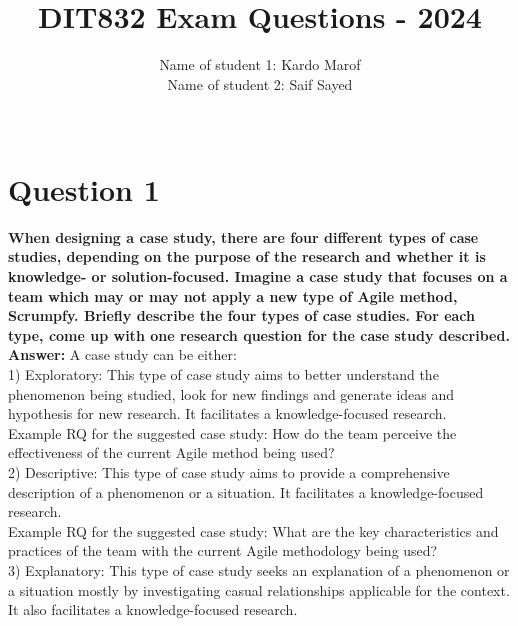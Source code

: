 \documentclass[conference]{IEEEtran}
\begin{document}
\title{DIT832 Exam Questions - 2024}

\author{Name of student 1: Kardo Marof\\
Name of student 2: Saif Sayed\\ \\
}

\maketitle


\section{Question 1}

\textbf{When designing a case study, there are four different types of case studies, depending on the purpose of the research and whether it is knowledge- or solution-focused. Imagine a case study that focuses on a team which may or may not apply a new type of Agile method, Scrumpfy. Briefly describe the four types of case studies. For each type, come up with one research question for the case study described.} \\

\textbf{Answer:} A case study can be either: \\

1) Exploratory: This type of case study aims to better understand the phenomenon being studied, look for new findings and generate ideas and hypothesis for new research. It facilitates a knowledge-focused research.\\

Example RQ for the suggested case study: How do the team perceive the effectiveness of the current Agile method being used?\\

2) Descriptive: This type of case study aims to provide a comprehensive description of a phenomenon or a situation. It facilitates a knowledge-focused research.\\

Example RQ for the suggested case study: What are the key characteristics and practices of the team with the current Agile methodology being used?\\

3) Explanatory: This type of case study  seeks an explanation of a phenomenon or a situation mostly by investigating casual relationships applicable for the context. It also facilitates a knowledge-focused research.\\
\end{document}
